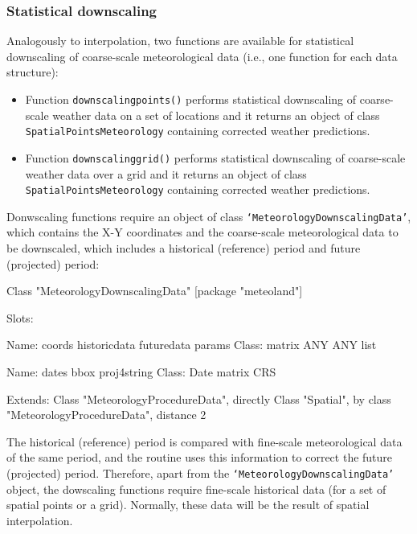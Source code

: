 \documentclass[11pt,a4paper]{article}
\begin{document}
\subsubsection{Statistical downscaling}
Analogously to interpolation, two functions are available for statistical downscaling of coarse-scale meteorological data (i.e., one function for each data structure):
\begin{itemize}
\item{Function \texttt{downscalingpoints()} performs statistical downscaling of coarse-scale weather data on a set of locations and it returns an object of class \texttt{SpatialPointsMeteorology} containing corrected weather predictions.}
\item{Function \texttt{downscalinggrid()} performs statistical downscaling of coarse-scale weather data over a grid and it returns an object of class \texttt{SpatialPointsMeteorology} containing corrected weather predictions.}
\end{itemize}
Donwscaling functions require an object of class \texttt{`MeteorologyDownscalingData'}, which contains the X-Y coordinates and the coarse-scale meteorological data to be downscaled, which includes a historical (reference) period and future (projected) period:
\begin{Schunk}
\begin{Soutput}
Class "MeteorologyDownscalingData" [package "meteoland"]

Slots:
                                                          
Name:        coords historicdata   futuredata       params
Class:       matrix          ANY          ANY         list
                                             
Name:         dates         bbox  proj4string
Class:         Date       matrix          CRS

Extends: 
Class "MeteorologyProcedureData", directly
Class "Spatial", by class "MeteorologyProcedureData", distance 2
\end{Soutput}
\end{Schunk}
The historical (reference) period is compared with fine-scale meteorological data of the same period, and the routine uses this information to correct the future (projected) period. Therefore, apart from the \texttt{`MeteorologyDownscalingData'} object, the dowscaling functions require fine-scale historical data (for a set of spatial points or a grid). Normally, these data will be the result of spatial interpolation.
\end{document}
